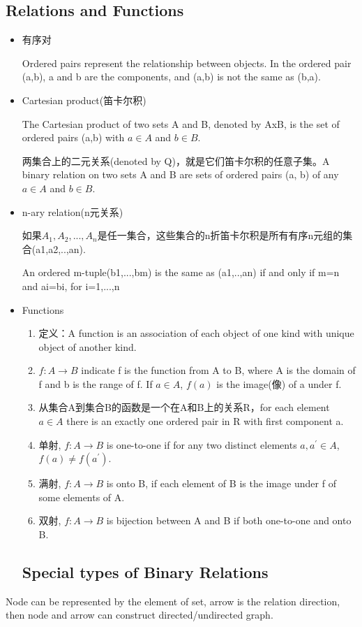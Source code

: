 \documentclass[UTF8]{ctexart}
\begin{document}
\subsection{Relations and Functions}
\begin{itemize}
    \item 有序对
    
    Ordered pairs represent the relationship between objects. In the ordered pair (a,b), a and b are the components, and (a,b) is not the same as (b,a).

    \item Cartesian product(笛卡尔积)
    
    The Cartesian product of two sets A and B, denoted by AxB, is the set of ordered pairs (a,b) with $a \in A$ and $b \in B$.
    
    两集合上的二元关系(denoted by Q)，就是它们笛卡尔积的任意子集。A binary relation on two sets A and B are sets of ordered pairs (a, b) of any $a \in A$ and $b \in B$.

    \item n-ary relation(n元关系)
    
    如果$A_1,A_2,...,A_n$是任一集合，这些集合的n折笛卡尔积是所有有序n元组的集合(a1,a2,..,an).

    An ordered m-tuple(b1,...,bm) is the same as (a1,..,an) if and only if m=n and ai=bi, for i=1,...,n

    \item Functions
    \begin{enumerate}
        \item 定义：A function is an association of each object of one kind with unique object of another kind.
        
        \item $f:A\rightarrow B$ indicate f is the function from A to B, where A is the domain of f and b is the range of f. If $a \in A $, $f(a)$ is the image(像) of a under f.
        
        \item 从集合A到集合B的函数是一个在A和B上的关系R，for each element $a \in A$ there is an exactly one ordered pair in R with first component a.
        
        \item 单射, $f:A \rightarrow B$ is one-to-one if for any two distinct elements $a,a^{'} \in A$,$f(a)\neq f(a^{'})$.
        \item 满射, $f:A \rightarrow B$ is onto B, if each element of B is the image under f of some elements of A.
        \item 双射, $f:A \rightarrow B$ is bijection between A and B if both one-to-one and onto B.
    \end{enumerate}

\subsection{Special types of Binary Relations}



\end{itemize}
Node can be represented by the element of set, arrow is the relation direction, then node and arrow can construct directed/undirected graph.
\end{document}

